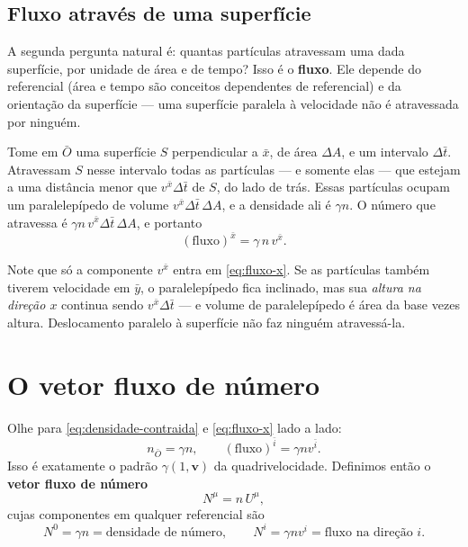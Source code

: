 \documentclass[12pt,a4paper,oneside]{book}
\theoremstyle{rgplain}
\theoremstyle{rgremark}
\begin{document}
\subsection*{Fluxo através de uma superfície}

A segunda pergunta natural é: quantas partículas atravessam uma dada
superfície, por unidade de área e de tempo? Isso é o \textbf{fluxo}. Ele
depende do referencial (área e tempo são conceitos dependentes de
referencial) e da orientação da superfície --- uma superfície paralela à
velocidade não é atravessada por ninguém.

Tome em $\bar O$ uma superfície $S$ perpendicular a $\bar x$, de área
$\Delta A$, e um intervalo $\Delta \bar t$. Atravessam $S$ nesse intervalo
todas as partículas --- e somente elas --- que estejam a uma distância menor
que $v^{\bar x}\Delta \bar t$ de $S$, do lado de trás. Essas partículas ocupam
um paralelepípedo de volume $v^{\bar x}\Delta \bar t\,\Delta A$, e a densidade
ali é $\gamma n$. O número que atravessa é $\gamma n\,v^{\bar x}\Delta \bar t\,\Delta A$, e portanto
\begin{equation}
  (\text{fluxo})^{\bar x}=\gamma\,n\,v^{\bar x} .
  \label{eq:fluxo-x}
\end{equation}

\begin{atencao}
Note que só a componente $v^{\bar x}$ entra em \eqref{eq:fluxo-x}. Se as
partículas também tiverem velocidade em $\bar y$, o paralelepípedo fica
inclinado, mas sua \emph{altura na direção $x$} continua sendo $v^{\bar x}\Delta \bar t$ --- e volume de paralelepípedo é área da base vezes altura.
Deslocamento paralelo à superfície não faz ninguém atravessá-la.
\end{atencao}

\section{O vetor fluxo de número}
\label{sec:vetor-fluxo}

Olhe para \eqref{eq:densidade-contraida} e \eqref{eq:fluxo-x} lado a lado:
\[
  n_{\bar O}=\gamma n,\qquad (\text{fluxo})^{\bar i}=\gamma n v^{\bar i} .
\]
Isso é exatamente o padrão $\gamma(1,\bm v)$ da quadrivelocidade. Definimos
então o \textbf{vetor fluxo de número}
\begin{equation}
  N^\mu = n\,U^\mu ,
  \label{eq:vetor-N}
\end{equation}
cujas componentes em qualquer referencial são
\begin{equation}
  N^0=\gamma n=\text{densidade de número},
  \qquad
  N^{i}=\gamma n v^{i}=\text{fluxo na direção } i .
  \label{eq:componentes-N}
\end{equation}
\end{document}
